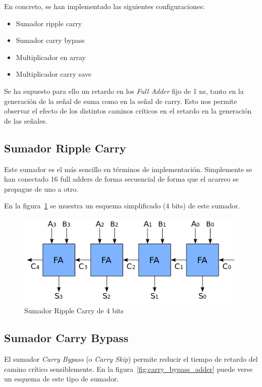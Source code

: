 \documentclass[a4paper,12pt]{article}
\begin{document}
En concreto, se han implementado las siguientes configuraciones:
\begin{itemize}
\item Sumador ripple carry
\item Sumador carry bypass
\item Multiplicador en array
\item Multiplicador carry save
\end{itemize}

Se ha supuesto para ello un retardo en los \emph{Full Adder} fijo de 1 ns, tanto en la generación de la señal de suma como en la señal de carry. Esto nos permite observar el efecto de los distintos caminos críticos en el retardo en la generación de las señales.

\subsection{Sumador Ripple Carry}
Este sumador es el más sencillo en términos de implementación. Simplemente se han conectado 16 full adders de forma secuencial de forma que el acarreo se propague de uno a otro.

En la figura~\ref{fig:ripple_carry_adder} se muestra un esquema simplificado (4 bits) de este sumador.

\begin{figure}[hbt]
\includegraphics[width=\textwidth]{img/ripple_carry_adder.png} 
\caption{Sumador Ripple Carry de 4 bits} \label{fig:ripple_carry_adder}
\end{figure}

\clearpage

\subsection{Sumador Carry Bypass}
El sumador \emph{Carry Bypass} (o \emph{Carry Skip}) permite reducir el tiempo de retardo del camino crítico sensiblemente. En la figura~\ref{fig:carry_bypass_adder} puede verse un esquema de este tipo de sumador.
\end{document}
